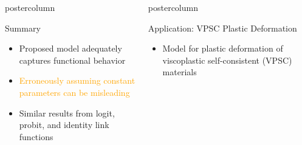 \documentclass[final,10pt]{beamer}  %
\newlength{\columnheight}
\begin{document}
\begin{frame}{}
\begin{columns}[t]
\begin{column}{.33\textwidth}
\begin{beamercolorbox}[center,wd=1.475\textwidth]{postercolumn}
\begin{minipage}[T]{\textwidth}
{        \begin{block}{Summary}
            {\small
            \begin{itemize}\itemsep2ex
            \item
            Proposed model adequately captures functional behavior

            \item
            \textcolor{orange}{Erroneously assuming constant parameters can be misleading}

            \item
            Similar results from logit, probit, and identity link functions

            \end{itemize}
        }
        \end{block}






        }%
        \end{minipage}
        \end{beamercolorbox}
    \end{column}

    \begin{column}{.33\textwidth}
        \begin{beamercolorbox}[center,wd=1.625\textwidth]{postercolumn}
        \begin{minipage}[T]{\textwidth}
        \parbox[t][\columnheight]{\textwidth}{ %
        \begin{block}{Application: VPSC Plastic Deformation}
            {\small
            \begin{itemize}\itemsep2ex
                \item
                Model for plastic deformation of viscoplastic self-consistent (VPSC) materials


\end{itemize}}
\end{block}}
\end{minipage}
\end{beamercolorbox}
\end{column}
\end{columns}
\end{frame}
\end{document}
